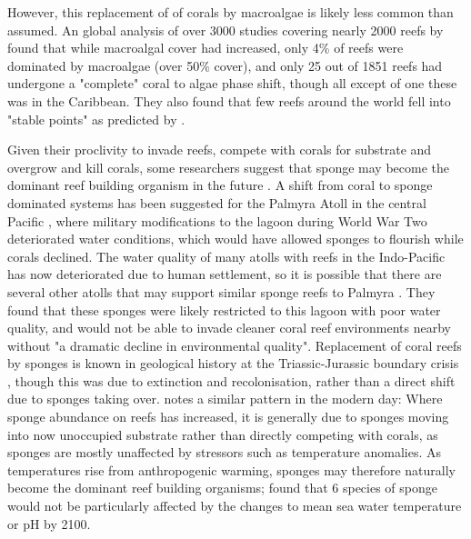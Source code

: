 \documentclass[11pt,a4paper]{article}
\begin{document}
However, this replacement of of corals by macroalgae is likely less common than assumed.
 An global analysis of over 3000 studies covering nearly 2000 reefs by \cite{Bruno2009} found that while macroalgal cover had increased, only 4\% of reefs were dominated by macroalgae (over 50\% cover), and only 25 out of 1851 reefs had undergone a "complete" coral to algae phase shift, though all except of one these was in the Caribbean.
 They also found that few reefs around the world fell into "stable points" as predicted by \cite{Mumby2007}.
 
Given their proclivity to invade reefs, compete with corals for substrate and overgrow and kill corals, some researchers suggest that sponge may become the dominant reef building organism in the future \citep{Bell2013}. 
 A shift from coral to sponge dominated systems has been suggested for the Palmyra Atoll in the central Pacific \citep{Knapp2013}, where military modifications to the lagoon during World War Two deteriorated water conditions, which would have allowed sponges to flourish while corals declined. %
 The water quality of many atolls with reefs in the Indo-Pacific has now deteriorated due to human settlement, so it is possible that there are several other atolls that may support similar sponge reefs to Palmyra \citep{Bell2013}.
 They found that these sponges were likely restricted to this lagoon with poor water quality, and would not be able to invade cleaner coral reef environments nearby without "a dramatic decline in environmental quality". 
Replacement of coral reefs by sponges is known in geological history at the Triassic-Jurassic boundary crisis \citep{Delecat2011}, though this was due to extinction and recolonisation, rather than a direct shift due to sponges taking over.
 \cite{Bell2013} notes a similar pattern in the modern day: Where sponge abundance on reefs has increased, it is generally due to sponges moving into now unoccupied substrate rather than directly competing with corals, as sponges are mostly unaffected by stressors such as temperature anomalies. 
 As temperatures rise from anthropogenic warming, sponges may therefore naturally become the dominant reef building organisms; \cite{Duckworth2012} found that 6 species of sponge would not be particularly affected by the changes to mean sea water temperature or pH by 2100.
 
\end{document}
